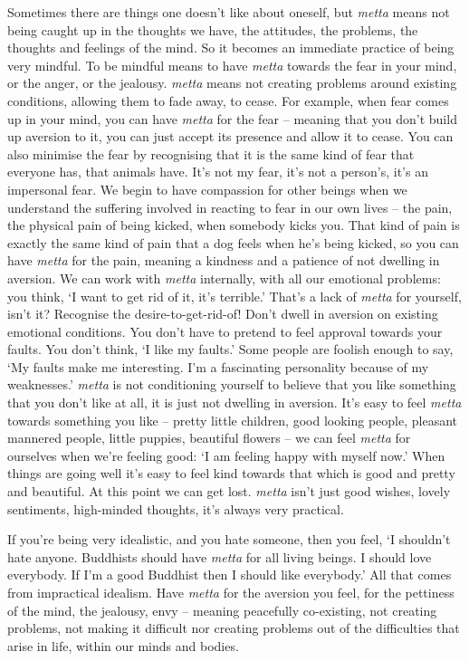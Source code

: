 Sometimes there are things one doesn't like about oneself, but \textit{metta} means not being caught up in the thoughts we have, the attitudes, the problems, the thoughts and feelings of the mind. So it becomes an immediate practice of being very mindful. To be mindful means to have \textit{metta} towards the fear in your mind, or the anger, or the jealousy. \textit{metta} means not creating problems around existing conditions, allowing them to fade away, to cease. For example, when fear comes up in your mind, you can have \textit{metta} for the fear -- meaning that you don't build up aversion to it, you can just accept its presence and allow it to cease. You can also minimise the fear by recognising that it is the same kind of fear that everyone has, that animals have. It's not my fear, it's not a person's, it's an impersonal fear. We begin to have compassion for other beings when we understand the suffering involved in reacting to fear in our own lives -- the pain, the physical pain of being kicked, when somebody kicks you. That kind of pain is exactly the same kind of pain that a dog feels when he's being kicked, so you can have \textit{metta} for the pain, meaning a kindness and a patience of not dwelling in aversion. We can work with \textit{metta} internally, with all our emotional problems: you think, `I want to get rid of it, it's terrible.' That's a lack of \textit{metta} for yourself, isn't it? Recognise the desire-to-get-rid-of! Don't dwell in aversion on existing emotional conditions. You don't have to pretend to feel approval towards your faults. You don't think, `I like my faults.' Some people are foolish enough to say, `My faults make me interesting. I'm a fascinating personality because of my weaknesses.' \textit{metta} is not conditioning yourself to believe that you like something that you don't like at all, it is just not dwelling in aversion. It's easy to feel \textit{metta} towards something you like -- pretty little children, good looking people, pleasant mannered people, little puppies, beautiful flowers -- we can feel \textit{metta} for ourselves when we're feeling good: `I am feeling happy with myself now.' When things are going well it's easy to feel kind towards that which is good and pretty and beautiful. At this point we can get lost. \textit{metta} isn't just good wishes, lovely sentiments, high-minded thoughts, it's always very practical.

If you're being very idealistic, and you hate someone, then you feel, `I shouldn't hate anyone. Buddhists should have \textit{metta} for all living beings. I should love everybody. If I'm a good Buddhist then I should like everybody.' All that comes from impractical idealism. Have \textit{metta} for the aversion you feel, for the pettiness of the mind, the jealousy, envy -- meaning peacefully co-existing, not creating problems, not making it difficult nor creating problems out of the difficulties that arise in life, within our minds and bodies.

